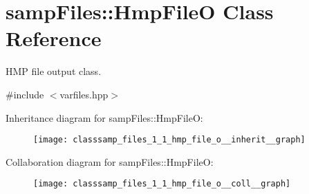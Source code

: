 \hypertarget{classsamp_files_1_1_hmp_file_o}{}\section{samp\+Files\+:\+:Hmp\+FileO Class Reference}
\label{classsamp_files_1_1_hmp_file_o}


H\+MP file output class.  




{\ttfamily \#include $<$varfiles.\+hpp$>$}



Inheritance diagram for samp\+Files\+:\+:Hmp\+FileO\+:\nopagebreak
\begin{figure}[H]
\begin{center}
\leavevmode
\texttt{[image: classsamp\_files\_1\_1\_hmp\_file\_o\_\_inherit\_\_graph]}
\end{center}
\end{figure}


Collaboration diagram for samp\+Files\+:\+:Hmp\+FileO\+:\nopagebreak
\begin{figure}[H]
\begin{center}
\leavevmode
\texttt{[image: classsamp\_files\_1\_1\_hmp\_file\_o\_\_coll\_\_graph]}
\end{center}
\end{figure}
